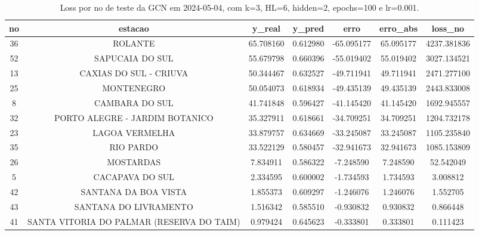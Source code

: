 \begin{table}[h]
\centering
\caption{Loss por no de teste da GCN em 2024-05-04, com k=3, HL=6, hidden=2, epochs=100 e lr=0.001.}
\label{tab:gcn_loss_k3_hl6_h2_e100_d20240504}
\begin{tabular}{ccccccc}
\toprule
no & estacao & y\_real & y\_pred & erro & erro\_abs & loss\_no \\
\midrule
36 & ROLANTE & 65.708160 & 0.612980 & -65.095177 & 65.095177 & 4237.381836 \\
52 & SAPUCAIA DO SUL & 55.679798 & 0.660396 & -55.019402 & 55.019402 & 3027.134521 \\
13 & CAXIAS DO SUL - CRIUVA & 50.344467 & 0.632527 & -49.711941 & 49.711941 & 2471.277100 \\
25 & MONTENEGRO & 50.054073 & 0.618934 & -49.435139 & 49.435139 & 2443.833008 \\
8 & CAMBARA DO SUL & 41.741848 & 0.596427 & -41.145420 & 41.145420 & 1692.945557 \\
32 & PORTO ALEGRE - JARDIM BOTANICO & 35.327911 & 0.618661 & -34.709251 & 34.709251 & 1204.732178 \\
23 & LAGOA VERMELHA & 33.879757 & 0.634669 & -33.245087 & 33.245087 & 1105.235840 \\
35 & RIO PARDO & 33.522129 & 0.580457 & -32.941673 & 32.941673 & 1085.153809 \\
26 & MOSTARDAS & 7.834911 & 0.586322 & -7.248590 & 7.248590 & 52.542049 \\
5 & CACAPAVA DO SUL & 2.334595 & 0.600002 & -1.734593 & 1.734593 & 3.008812 \\
42 & SANTANA DA BOA VISTA & 1.855373 & 0.609297 & -1.246076 & 1.246076 & 1.552705 \\
43 & SANTANA DO LIVRAMENTO & 1.516342 & 0.585510 & -0.930832 & 0.930832 & 0.866448 \\
41 & SANTA VITORIA DO PALMAR (RESERVA DO TAIM) & 0.979424 & 0.645623 & -0.333801 & 0.333801 & 0.111423 \\
\bottomrule
\end{tabular}
\end{table}

